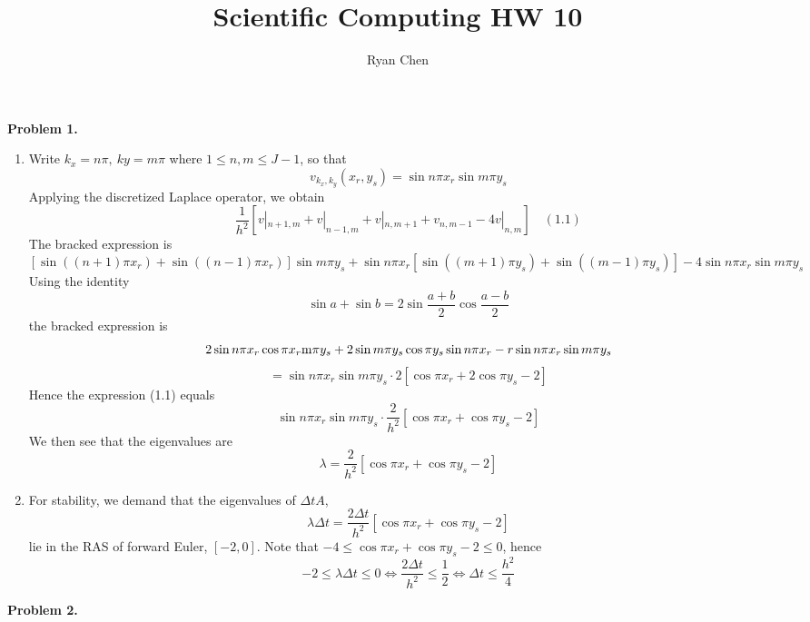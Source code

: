 \documentclass{article}
\title{Scientific Computing HW 10}
\author{Ryan Chen}
\def\tbf#1{\textbf{#1}}
\newcommand{\sbr}[1]{\left[#1\right]}
\begin{document}
	
\maketitle



\tbf{Problem 1.}

\begin{enumerate}[label=(\alph*)]
	
\item Write $k_x=n\pi,~ky=m\pi$ where $1\le n,m\le J-1$, so that
$$v_{k_x,k_y}(x_r,y_s) = \sin n\pi x_r\sin m\pi y_s$$
Applying the discretized Laplace operator, we obtain
$$\frac{1}{h^2}\sbr{v|_{n+1,m}+v|_{n-1,m}+v|_{n,m+1}+v_{n,m-1}-4v|_{n,m}} \quad (1.1)$$
The bracked expression is
$$\sbr{\sin((n+1)\pi x_r)+\sin((n-1)\pi x_r)}\sin m\pi y_s + \sin n\pi x_r\sbr{\sin((m+1)\pi y_s)+\sin((m-1)\pi y_s)} - 4\sin n\pi x_r\sin m\pi y_s$$
Using the identity
$$\sin a + \sin b = 2\sin\frac{a+b}{2}\cos\frac{a-b}{2}$$
the bracked expression is
$$2\sin n\pi x_r\cos\pi x_r\si m\pi y_s + 2\sin m\pi y_s\cos\pi y_s\sin n\pi x_r - r\sin n\pi x_r\sin m\pi y_s$$
$$= \sin n\pi x_r\sin m\pi y_s\cdot 2\sbr{\cos\pi x_r+2\cos\pi y_s-2}$$
Hence the expression (1.1) equals
$$\sin n\pi x_r\sin m\pi y_s\cdot \frac{2}{h^2}\sbr{\cos\pi x_r+\cos\pi y_s-2}$$
We then see that the eigenvalues are
$$\lambda = \frac{2}{h^2}\sbr{\cos\pi x_r+\cos\pi y_s-2}$$


\item For stability, we demand that the eigenvalues of $\Delta tA$,
$$\lambda\Delta t = \frac{2\Delta t}{h^2}[\cos\pi x_r+\cos\pi y_s-2]$$
lie in the RAS of forward Euler, $[-2,0]$. Note that $-4\le\cos\pi x_r+\cos\pi y_s-2\le0$, hence
$$-2 \le \lambda\Delta t \le 0
\iff \frac{2\Delta t}{h^2} \le \frac12
\iff \Delta t \le \frac{h^2}{4}$$ 

\end{enumerate}


\tbf{Problem 2.}
\end{document}
